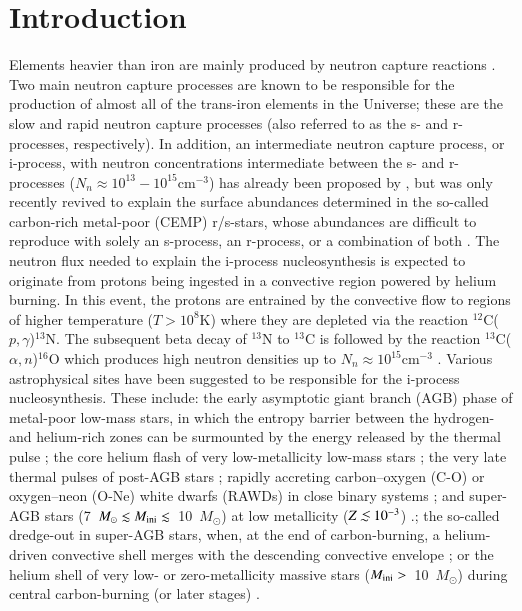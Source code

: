 \documentclass{aa}
\def\la{\,\,\raise0.14em\hbox{$<$}\kern-0.76em\lower0.28em\hbox{$\sim$}\,\,}
\def\iso#1{$^{#1}$}
\def\msun{M_{\odot}}
\def\pg{$p,\gamma$}
\def\cm3{cm$^{-3}$}
\def\an{$\alpha,n$}
\begin{document}
\section{Introduction}
\label{sect:intro}
Elements heavier than iron are mainly produced by neutron capture reactions \citep[e.g.][]{Arnould20}.
Two main neutron capture processes are known to be responsible for the production  of almost
all of the trans-iron elements in the Universe; these are the slow and rapid neutron capture processes (also referred to as the s- and r-processes, respectively).
In addition, an intermediate neutron capture process, or i-process, with neutron concentrations intermediate between the s- and r-processes ($N_n \approx 10^{13}-10^{15}$\cm3) has already been proposed by \citet{Cowan77}, but was only recently revived
to explain the surface abundances determined in the so-called carbon-rich metal-poor (CEMP) r/s-stars, whose abundances are difficult to reproduce with solely an s-process, an r-process, or a combination of both \citep[e.g.][]{Jonsell06, Lugaro12,Dardelet14,Roederer16}. The neutron flux needed to explain the i-process nucleosynthesis is expected to originate from protons being ingested in a convective region powered by helium burning. In this event, the protons are entrained by the convective flow to regions of higher temperature ($T > 10^8$K) where they are depleted via the reaction \iso{12}C(\pg)\iso{13}N. The subsequent beta decay of \iso{13}N to \iso{13}C is followed by the reaction \iso{13}C(\an)\iso{16}O which produces high neutron densities up to $N_n \approx 10^{15}$\cm3 \citep[e.g.][]{Siess02,Campbell08,Herwig11}.
Various astrophysical sites have been suggested to be responsible for the i-process nucleosynthesis. These include: the early asymptotic giant branch (AGB) phase of metal-poor low-mass stars, in which the entropy barrier between the hydrogen- and helium-rich zones can be surmounted by the energy released by the thermal pulse \citep{Fujimoto00,Chieffi01,Siess02,Iwamoto04,Cristallo09b,Suda10,Cristallo16,Choplin21}; the core helium flash of very low-metallicity low-mass stars \citep{Fujimoto00,Schlattl01,Suda10,Campbell10, Cruz13}; the very late thermal pulses of post-AGB stars \citep{Herwig11};
rapidly accreting carbon--oxygen (C-O) or oxygen--neon (O-Ne) white dwarfs (RAWDs) in close binary systems \citep{Denissenkov17,Denissenkov19}; and super-AGB stars (7~$\msun \lesssim M_{\rm ini} \lesssim$~10~$\msun$) at low metallicity ($Z\la 10^{-3}$)  \citep{Jones16}.; the so-called dredge-out in super-AGB stars, when, at the end of carbon-burning, a helium-driven convective shell merges with the descending convective envelope \citep{Siess07};
or the helium shell of very low- or zero-metallicity massive stars ($M_{\rm ini} > $~10~$\msun$) during central carbon-burning (or later stages) \citep{Banerjee18, Clarkson18, Clarkson20}.
\end{document}

